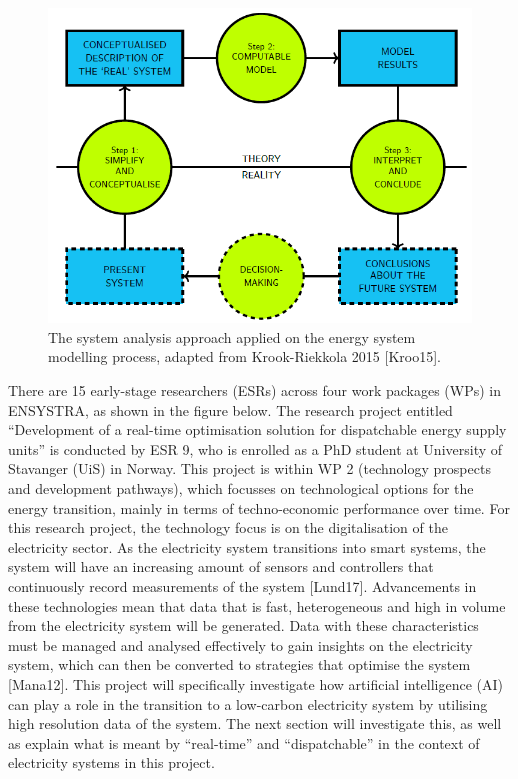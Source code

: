 \begin{figure}
\centering
\includegraphics{images/system-analysis.png}
\caption{The system analysis approach applied on the energy system
modelling process, adapted from Krook-Riekkola 2015 {[}Kroo15{]}.}
\end{figure}

There are 15 early-stage researchers (ESRs) across four work packages
(WPs) in ENSYSTRA, as shown in the figure below. The research project
entitled ``Development of a real-time optimisation solution for
dispatchable energy supply units'' is conducted by ESR 9, who is
enrolled as a PhD student at University of Stavanger (UiS) in Norway.
This project is within WP 2 (technology prospects and development
pathways), which focusses on technological options for the energy
transition, mainly in terms of techno-economic performance over time.
For this research project, the technology focus is on the digitalisation
of the electricity sector. As the electricity system transitions into
smart systems, the system will have an increasing amount of sensors and
controllers that continuously record measurements of the system
{[}Lund17{]}. Advancements in these technologies mean that data that is
fast, heterogeneous and high in volume from the electricity system will
be generated. Data with these characteristics must be managed and
analysed effectively to gain insights on the electricity system, which
can then be converted to strategies that optimise the system
{[}Mana12{]}. This project will specifically investigate how artificial
intelligence (AI) can play a role in the transition to a low-carbon
electricity system by utilising high resolution data of the system. The
next section will investigate this, as well as explain what is meant by
``real-time'' and ``dispatchable'' in the context of electricity systems
in this project.

